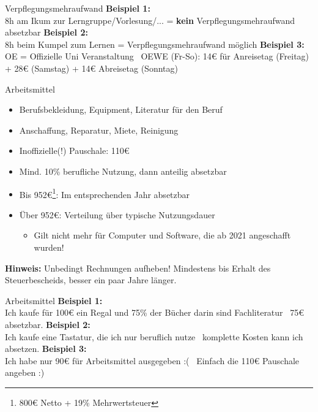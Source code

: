 \documentclass{beamer}
\begin{document}
			\begin{frame}{Verpflegungsmehraufwand}
				\textbf{Beispiel 1:}\\
				8h am Ikum zur Lerngruppe/Vorlesung/... = \textbf{kein} Verpflegungsmehraufwand absetzbar\n\pause
				\textbf{Beispiel 2:}\\
				8h beim Kumpel zum Lernen = Verpflegungsmehraufwand möglich\n\pause
				\textbf{Beispiel 3:}\\
				OE = Offizielle Uni Veranstaltung \textrightarrow\ OEWE (Fr-So): 14€ für Anreisetag (Freitag) + 28€ (Samstag) + 14€ Abreisetag (Sonntag)
			\end{frame}
		
			\begin{frame}{Arbeitsmittel}
				\begin{itemize}
					\item Berufsbekleidung, Equipment, Literatur für den Beruf
					\item Anschaffung, Reparatur, Miete, Reinigung
					\item Inoffizielle(!) Pauschale: 110€
					\item Mind. 10\% berufliche Nutzung, dann anteilig absetzbar
					\item Bis 952€\footnote{800€ Netto + 19\% Mehrwertsteuer}: Im entsprechenden Jahr absetzbar
					\item Über 952€: Verteilung über typische Nutzungsdauer
					\begin{itemize}
						\item Gilt nicht mehr für Computer und Software, die ab 2021 angeschafft wurden!
					\end{itemize}
				\end{itemize}\n\pause
			
				\textbf{Hinweis:} Unbedingt Rechnungen aufheben! Mindestens bis Erhalt des Steuerbescheids, besser ein paar Jahre länger.
			\end{frame}
		
			\begin{frame}{Arbeitsmittel}
				\textbf{Beispiel 1:}\\
				Ich kaufe für 100€ ein Regal und 75\% der Bücher darin sind Fachliteratur \textrightarrow\ 75€ absetzbar.\n\pause
				\textbf{Beispiel 2:}\\
				Ich kaufe eine Tastatur, die ich nur beruflich nutze \textrightarrow\ komplette Kosten kann ich absetzen.\n\pause
				\textbf{Beispiel 3:}\\
				Ich habe nur 90€ für Arbeitsmittel ausgegeben :( \textrightarrow\ Einfach die 110€ Pauschale angeben :)
			\end{frame}
		
\end{document}
